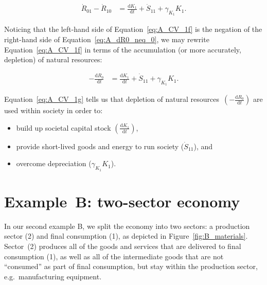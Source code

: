  \begin{align}\label{eq:A_CV_1f}
	\dot{R}_{01} 
	- \dot{R}_{10}												&
	= 	\frac{\mathrm{d}K_{1}}{\mathrm{d}t}
	+ \dot{S}_{11}
	+ \gamma_{K_{1}}{K}_{1}.
\end{align}

Noticing that the left-hand side
of Equation~\ref{eq:A_CV_1f} is the negation 
of the right-hand side of Equation~\ref{eq:A_dR0_neq_0},
we may rewrite Equation~\ref{eq:A_CV_1f}
in terms of the accumulation 
(or more accurately, depletion)
of natural resources: 

 \begin{align}\label{eq:A_CV_1g}
	- 	\frac{\mathrm{d}R_{0}}{\mathrm{d}t}	&
	= 	\frac{\mathrm{d}K_{1}}{\mathrm{d}t}
	+ \dot{S}_{11}
	+ \gamma_{K_{1}}{K}_{1}.
\end{align}

Equation~\ref{eq:A_CV_1g} tells us that depletion of
natural resources~$\left(-\frac{\mathrm{d}R_{0}}{\mathrm{d}t}\right)$
are used within society in order to:

\begin{itemize}
	\item build up societal capital stock 
	$\left(\frac{\mathrm{d}K_{1}}{\mathrm{d}t}\right)$,
	\item provide short-lived goods and energy to 
	run society ($\dot{S}_{11}$), and
	\item overcome depreciation
	($\gamma_{K_{1}}{K}_{1}$).
\end{itemize}




\section{Example~B: two-sector economy} %
\label{sec:B_materials}

In our second example B, we split the economy into two sectors: 
a production sector (2) and final consumption (1), 
as depicted in Figure~\ref{fig:B_materials}. 
Sector~(2) produces all of the goods and services 
that are delivered to final consumption (1), 
as well as all of the intermediate goods that are not ``consumed'' 
as part of final consumption, but stay within the production sector, e.g.\ manufacturing equipment.

